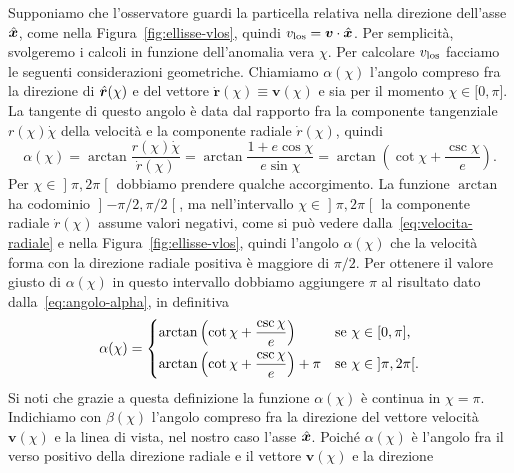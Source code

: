 {Supponiamo che l'osservatore guardi la particella relativa nella direzione
dell'asse $\hat{\bm{x}}$, come nella Figura~\ref{fig:ellisse-vlos}, quindi
$v_\textup{los} = \bm{v}\cdot\hat{\bm{x}}$.  Per semplicità, svolgeremo i calcoli
in funzione dell'anomalia vera $\chi$. Per calcolare $v_\textup{los}$ facciamo
le seguenti considerazioni geometriche. Chiamiamo $\alpha(\chi)$ l'angolo
compreso fra la direzione di $\hat{\bm{r}}(\chi)$ e del vettore
$\dot{\bm{r}}(\chi) \equiv \bm{v}(\chi)$ e sia per il momento
$\chi \in \mathopen{[}0, \pi\mathclose{]}$. La tangente di questo angolo è data
dal rapporto fra la componente tangenziale $r(\chi)\dot{\chi}$ della velocità e
la componente radiale $\dot{r}(\chi)$, quindi
\begin{equation}
  \label{eq:angolo-alpha}
  \alpha(\chi) = \arctan\frac{r(\chi)\dot{\chi}}{\dot{r}(\chi)} =
  \arctan\frac{1 + e\cos\chi}{e\sin\chi} = \arctan
  \left(
    \cot\chi + \frac{\csc\chi}{e}
  \right).
\end{equation}
Per $\chi \in \mathopen{]}\pi, 2\pi\mathclose{[}$ dobbiamo prendere qualche
accorgimento. La funzione $\arctan$ ha codominio
$\mathopen{]}-\pi/2, \pi/2\mathclose{[}$, ma nell'intervallo
$\chi \in \mathopen{]}\pi, 2\pi\mathclose{[}$ la componente radiale
$\dot{r}(\chi)$ assume valori negativi, come si può vedere
dalla~\eqref{eq:velocita-radiale} e nella Figura~\ref{fig:ellisse-vlos}, quindi
l'angolo $\alpha(\chi)$ che la velocità forma con la direzione radiale positiva
è maggiore di $\pi/2$. Per ottenere il valore giusto di $\alpha(\chi)$ in questo
intervallo dobbiamo aggiungere $\pi$ al risultato dato
dalla~\eqref{eq:angolo-alpha}, in definitiva
\begin{equation}
  \label{eq:angolo-alpha2}
  \alpha(\chi) =
  \begin{dcases}
    \arctan
    \left(
      \cot\chi + \frac{\csc\chi}{e}
    \right) & \text{se $\chi \in \mathopen{[}0, \pi\mathclose{]}$,}\\
    \arctan
    \left(
      \cot\chi + \frac{\csc\chi}{e}
    \right) + \pi & \text{se $\chi \in \mathopen{]}\pi, 2\pi\mathclose{[}$.}
  \end{dcases}
\end{equation}
Si noti che grazie a questa definizione la funzione $\alpha(\chi)$ è continua
in $\chi = \pi$. Indichiamo con $\beta(\chi)$ l'angolo compreso fra la
direzione del vettore velocità $\bm{v}(\chi)$ e la linea di vista, nel nostro
caso l'asse $\hat{\bm{x}}$. Poiché $\alpha(\chi)$ è l'angolo fra il verso
positivo della direzione radiale e il vettore $\bm{v}(\chi)$ e la direzione
}

